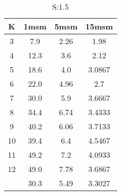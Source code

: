\begin{table}[H]
\centering
\begin{tabular}{c|ccc}
K &1msm &5msm &15msm\\
\hline
3 & 7.9 & 2.26 & 1.98\\
4 & 12.3 & 3.6 & 2.12\\
5 & 18.6 & 4.0 & 3.0867\\
6 & 22.0 & 4.96 & 2.7\\
7 & 30.0 & 5.9 & 3.6667\\
8 & 34.4 & 6.74 & 3.4333\\
9 & 40.2 & 6.06 & 3.7133\\
10 & 39.4 & 6.4 & 4.5467\\
11 & 49.2 & 7.2 & 4.0933\\
12 & 49.0 & 7.78 & 3.6867\\
\hline
& 30.3 & 5.49 & 3.3027\\
\end{tabular}
\caption{S:1.5}
\label{tab:s1.5}
\end{table}
